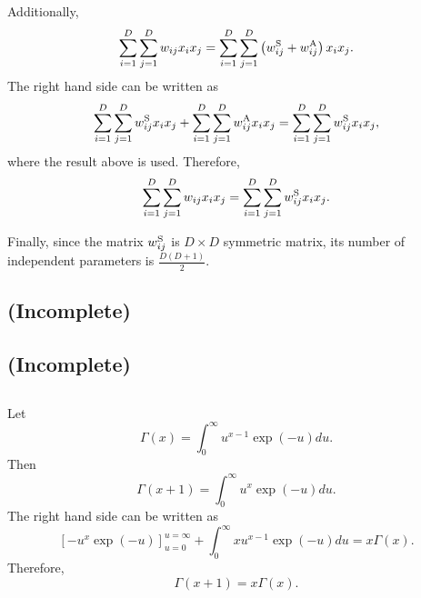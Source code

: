 Additionally,
%
\begin{equation}
\sum_{i = 1}^{D} \sum_{j = 1}^{D} w_{ij} x_i x_j = \sum_{i = 1}^{D} \sum_{j = 1}^{D} \left( w_{ij}^{\rm S} + w_{ij}^{\rm A} \right) x_i x_j.
\end{equation}
%
The right hand side can be written as
%
\begin{equation}
\sum_{i = 1}^{D} \sum_{j = 1}^{D} w_{ij}^{\rm S} x_i x_j + \sum_{i = 1}^{D} \sum_{j = 1}^{D} w_{ij}^{\rm A} x_i x_j = \sum_{i = 1}^{D} \sum_{j = 1}^{D} w_{ij}^{\rm S} x_i x_j,
\end{equation}
%
where the result above is used. 
Therefore,
%
\begin{equation}
\sum_{i = 1}^{D} \sum_{j = 1}^{D} w_{ij} x_i x_j = \sum_{i = 1}^{D} \sum_{j = 1}^{D} w_{ij}^{\rm S} x_i x_j.
\end{equation}
%

Finally, since the matrix $w_{ij}^{\rm S}$ is $D \times D$ symmetric matrix, its number of independent parameters is $\frac{D (D + 1)}{2}$.


\subsection{(Incomplete)}
\label{1.15}


\subsection{(Incomplete)}
\label{1.16}


\subsection{}
\label{1.17}
Let
%
\begin{equation}
\Gamma(x) = \int_{0}^{\infty} u ^ {x - 1} \exp(- u) du.
\end{equation}
%
Then
%
\begin{equation}
\Gamma(x + 1) = \int_{0}^{\infty} u ^ {x} \exp(- u) du.
\end{equation}
%
The right hand side can be written as 
%
\begin{equation}
\left[ - u ^ x \exp(- u) \right]_{u = 0}^{u = \infty} + \int_{0}^{\infty} x u ^ {x - 1} \exp(- u) du = x \Gamma(x).
\end{equation}
%
Therefore,
%
\begin{equation}
\Gamma( x + 1) = x \Gamma(x).
\end{equation}
%

